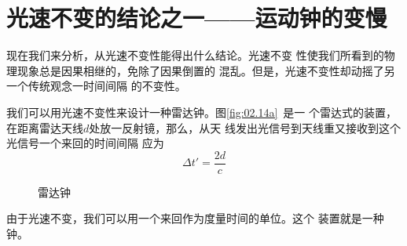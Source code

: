 \section{光速不变的结论之一——运动钟的变慢}\label{sec:02.07}

现在我们来分析，从光速不变性能得出什么结论。光速不变
性使我们所看到的物理现象总是因果相继的，免除了因果倒置的
混乱。但是，光速不变性却动摇了另一个传统观念一时间间隔
的不变性。

我们可以用光速不变性来设计一种雷达钟。图\ref{fig:02.14a}~是一
个雷达式的装置，在距离雷达天线$d$处放一反射镜，那么，从天
线发出光信号到天线重又接收到这个光信号一个来回的时间间隔
应为
\begin{equation*}
    \Delta t ' = \frac { 2 d } { c }
\end{equation*}
\begin{figure}[!h]
    \centering
    \quad
    \caption{雷达钟}
    \label{fig:02.14}
\end{figure}

由于光速不变，我们可以用一个来回作为度量时间的单位。这个
装置就是一种钟。

